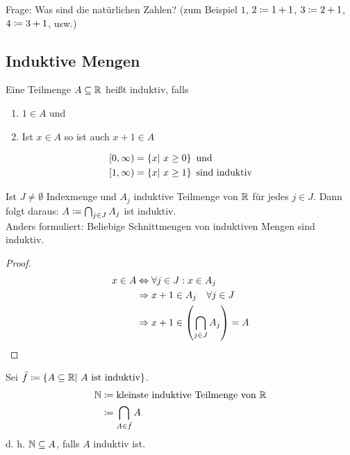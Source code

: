 \thispagestyle{pagenumberonly}
Frage: Was sind die natürlichen Zahlen? (zum Beispiel $1$, $2\coloneqq 1+1$, $3\coloneqq 2+1$, $4\coloneqq 3+1$, usw.)

\subsection{Induktive Mengen}
\begin{definition}
    Eine Teilmenge $A\subseteq \mathbb{R}$ heißt induktiv, falls
    \begin{enumerate}
        \item $1\in A$ und
        \item Ist $x\in A$ so ist auch $x+1\in A$
    \end{enumerate}
\end{definition}

\begin{beispiel}
    \begin{align*}
        \left[0, \infty\right) &= \left\{x|~x\geq 0\right\}\text{ und}\\
        \left[1, \infty\right) &= \left\{x|~x\geq 1\right\} \text{ sind induktiv}
    \end{align*}
\end{beispiel}

\begin{beobachtung}
    Ist $J\neq\emptyset$ Indexmenge und $A_j$ induktive Teilmenge von $\mathbb{R}$ für jedes $j\in J$.
    Dann folgt daraus: $A\coloneqq \bigcap_{j\in J}A_j$ ist induktiv.\\
    Anders formuliert: Beliebige Schnittmengen von induktiven Mengen sind induktiv.
    \begin{proof}
        \begin{align*}
            x\in A &\Leftrightarrow{} \forall j\in J: x \in A_j\\
            &\Rightarrow{} x+1 \in A_j \quad \forall j\in J\\
            &\Rightarrow{} x+1 \in \left(\bigcap_{j\in J}A_j\right)=A\qedhere
        \end{align*}
    \end{proof}
\end{beobachtung}

\begin{definition}
    Sei $\bar{f}\coloneqq\left\{A\subseteq \mathbb{R}|~A\text{ ist induktiv}\right\}$.
    \begin{align*}
        \mathbb{N} &\coloneqq \text{kleinste induktive Teilmenge von }\mathbb{R}\\
        &\coloneqq \bigcap_{A\in \bar{f}}A
    \end{align*}
    d. h. $\mathbb{N}\subseteq A$, falls $A$ induktiv ist.
\end{definition}


